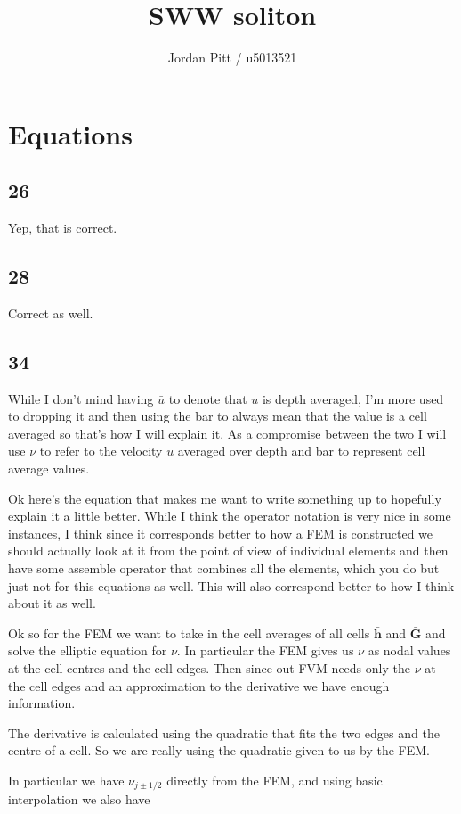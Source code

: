 \documentclass[12pt]{article}
\begin{document}
\title{SWW soliton}
\author{Jordan Pitt / u5013521}

\section{Equations}

\subsection{26}
Yep, that is correct.

\subsection{28}
Correct as well.

\subsection{34}
While I don't mind having $\bar{u}$ to denote that $u$ is depth averaged, I'm more used to dropping it and then using the bar to always mean that the value is a cell averaged so that's how I will explain it. As a compromise between the two I will use $\nu$ to refer to the velocity $u$ averaged over depth and bar to represent cell average values.

Ok here's the equation that makes me want to write something up to hopefully explain it a little better. While I think the operator notation is very nice in some instances, I think since it corresponds better to how a FEM is constructed we should actually look at it from the point of view of individual elements and then have some assemble operator  that combines all the elements, which you do but just not for this equations as well. This will also correspond better to how I think about it as well.

Ok so for the FEM we want to take in the cell averages of all cells $\bar{\boldsymbol{h}}$ and $\bar{\boldsymbol{G}}$ and solve the elliptic equation for $\nu$. In particular the FEM gives us $\nu$ as nodal values at the cell centres and the cell edges. Then since out FVM needs only the $\nu$ at the cell edges and an approximation to the derivative we have enough information. 

The derivative is calculated using the quadratic that fits the two edges and the centre of a cell. So we are really using the quadratic given to us by the FEM.

In particular we have $\nu_{j \pm 1/2}$ directly from the FEM, and using basic interpolation we also have
\end{document}
